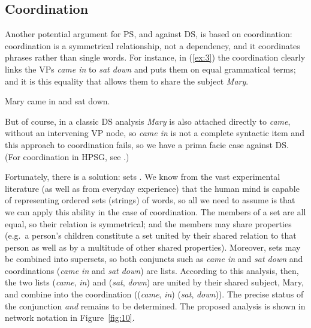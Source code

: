 \documentclass[output=paper
 	        ,biblatex
                ,babelshorthands
                ,newtxmath
                ,draftmode
                ,colorlinks, citecolor=brown
]{langscibook}
\begin{document}
\subsection{Coordination}
\label{sec:4.2}

Another potential argument for PS, and against DS, is based on coordination: coordination is a symmetrical relationship, not a dependency, and it coordinates phrases rather than single words. For instance, in (\ref{ex:3}) the coordination clearly links the VPs \emph{came in} to \emph{sat down} and puts them on equal grammatical terms; and it is this equality that allows them to share the subject \emph{Mary}.

\begin{exe}
	\ex \label{ex:3} Mary came in and sat down.
\end{exe}

But of course, in a classic DS analysis \emph{Mary} is also attached directly to \emph{came}, without an intervening VP node, so \emph{came in} is not a complete syntactic item and this approach to coordination fails, so we have a prima facie case against DS. (For coordination in HPSG, see .)

Fortunately, there is a solution: sets \citep[404--421]{Hudson90a-u}. We know from the vast experimental literature (as well as from everyday experience) that the human mind is capable of representing ordered sets (strings) of words, so all we need to assume is that we can apply this ability in the case of coordination. The members of a set are all equal, so their relation is symmetrical; and the members may share properties (e.g.\ a person’s children constitute a set united by their shared relation to that person as well as by a multitude of other shared properties). Moreover, sets may be combined into supersets, so both conjuncts such as \emph{came in} and \emph{sat down} and coordinations (\emph{came in} and \emph{sat down}) are lists. According to this analysis, then, the two lists (\emph{came}, \emph{in}) and (\emph{sat}, \emph{down}) are united by their shared subject, Mary, and combine into the coordination ((\emph{came}, \emph{in}) (\emph{sat}, \emph{down})). The precise status of the conjunction \emph{and} remains to be determined. The proposed analysis is shown in network notation in Figure~\ref{fig:10}.
\end{document}
